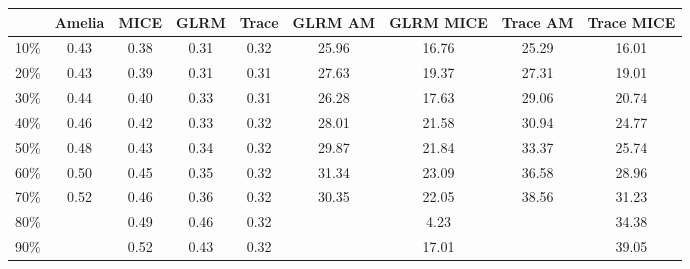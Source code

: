 \begin{table}[ht]
\centering
\begin{tabular}{|c|c|c|c|c|c|c|c|c|}
  \hline
 & Amelia & MICE & GLRM & Trace & GLRM AM & GLRM MICE & Trace AM & Trace MICE \\ 
  \hline
10\% & 0.43 & 0.38 & 0.31 & 0.32 & 25.96 & 16.76 & 25.29 & 16.01 \\ 
  20\% & 0.43 & 0.39 & 0.31 & 0.31 & 27.63 & 19.37 & 27.31 & 19.01 \\ 
  30\% & 0.44 & 0.40 & 0.33 & 0.31 & 26.28 & 17.63 & 29.06 & 20.74 \\ 
  40\% & 0.46 & 0.42 & 0.33 & 0.32 & 28.01 & 21.58 & 30.94 & 24.77 \\ 
  50\% & 0.48 & 0.43 & 0.34 & 0.32 & 29.87 & 21.84 & 33.37 & 25.74 \\ 
  60\% & 0.50 & 0.45 & 0.35 & 0.32 & 31.34 & 23.09 & 36.58 & 28.96 \\ 
  70\% & 0.52 & 0.46 & 0.36 & 0.32 & 30.35 & 22.05 & 38.56 & 31.23 \\ 
  80\% &  & 0.49 & 0.46 & 0.32 &  & 4.23 &  & 34.38 \\ 
  90\% &  & 0.52 & 0.43 & 0.32 &  & 17.01 &  & 39.05 \\ 
   \hline
\end{tabular}
\end{table}

